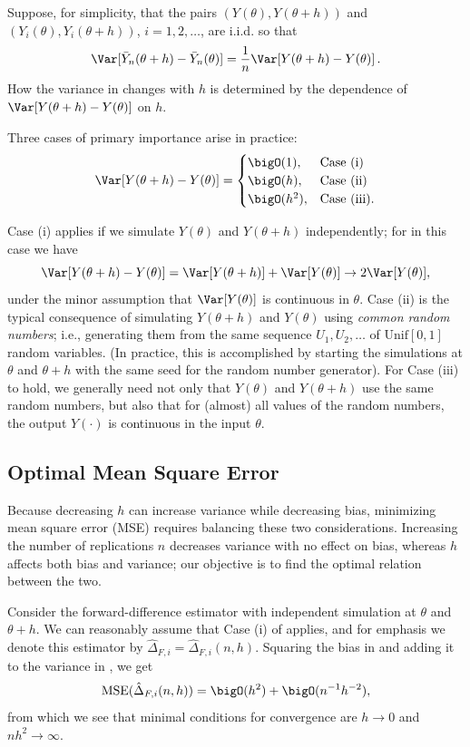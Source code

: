 Suppose, for simplicity, that the pairs $(Y(\theta), Y(\theta + h))$ and $(Y_i(\theta), Y_i(\theta +
	h))$, $i = 1, 2, \dots$, are i.i.d. so that
\[
	\Var [\bar{Y}_n(\theta + h) - \bar{Y}_n(\theta)] = \frac{1}{n}\Var [Y(\theta + h) - Y(\theta)] \,.
\]
How the variance in  changes with $h$ is determined by the dependence of
$\Var[Y(\theta + h) - Y(\theta)]$ on $h$.

Three cases of primary importance arise in practice:
\begin{equation} \label{eq:VarianceConvergenceCases}
	\Var[Y(\theta + h) - Y(\theta)] = \begin{cases}
		\bigO(1),   & \text{Case (i)}    \\
		\bigO(h),   & \text{Case (ii)}   \\
		\bigO(h^2), & \text{Case (iii).}
	\end{cases}
\end{equation}

Case (i) applies if we simulate $Y(\theta)$ and $Y(\theta + h)$ independently; for in this
case we have
\[
	\Var[Y(\theta + h) - Y(\theta)] = \Var[Y(\theta + h)] + \Var[Y(\theta)] \to 2\Var[Y(\theta)],
\]
under the minor assumption that $\Var[Y(\theta)]$ is continuous in $\theta$. Case (ii) is the
typical consequence of simulating $Y(\theta + h)$ and $Y(\theta)$ using \emph{common random numbers}; i.e., generating them from the same sequence $U_1, U_2, \dots$ of $\text{Unif}[0,1]$
random variables. (In practice, this is accomplished by starting the simulations at \(\theta\) and \(\theta + h\) with the same seed for the random number generator). For Case (iii) to hold, we generally need not only that \(Y(\theta)\) and \(Y(\theta + h)\) use the same random numbers, but also that for (almost) all values of the random numbers, the output \(Y(\cdot)\) is continuous in the input \(\theta\).

\subsection{Optimal Mean Square Error}
Because decreasing $h$ can increase variance while decreasing bias, minimizing mean square error (MSE) requires balancing these two considerations. Increasing the number of replications $n$ decreases variance with no effect on bias, whereas $h$ affects both bias and variance; our objective is to find the optimal relation between the two.

Consider the forward-difference estimator with independent simulation at $\theta$ and $\theta + h$. We can reasonably assume that Case (i) of  applies, and for emphasis we denote this estimator by $\hat{\Delta}_{F,i} = \hat{\Delta}_{F,i}(n, h)$. Squaring the bias in  and adding it to the variance in , we get
\[
	\mathrm{MSE}(\hat{\Delta}_{F,i}(n, h)) = \bigO(h^2) + \bigO(n^{-1}h^{-2}),
\]
from which we see that minimal conditions for convergence are $h \to 0$ and $nh^2 \to \infty$.

